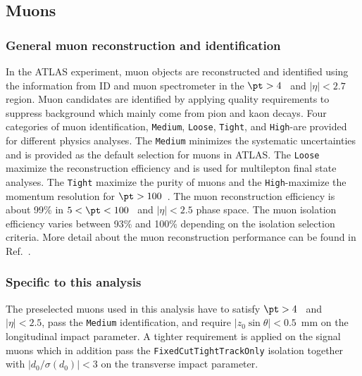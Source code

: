 
\subsection{Muons}
\label{subsec:event_muons}


\subsubsection{General muon reconstruction and identification}
\label{subsubsec:event_muons_general}
In the ATLAS experiment, muon objects are reconstructed and identified using the information from ID and muon spectrometer in the $\pt > 4$~{\GeV} and $|\eta| < 2.7$ region.
Muon candidates are identified by applying quality requirements to suppress background which mainly come from pion and kaon decays.
Four categories of muon identification, \texttt{Medium}, \texttt{Loose}, \texttt{Tight}, and \texttt{High}-\pt are provided for different physics analyses.
The \texttt{Medium} minimizes the systematic uncertainties and is provided as the default selection for muons in ATLAS.
The \texttt{Loose} maximize the reconstruction efficiency and is used for multilepton final state analyses.
The \texttt{Tight} maximize the purity of muons and the \texttt{High}-\pt maximize the momentum resolution for $\pt > 100$~{\GeV}.
The muon reconstruction efficiency is about 99\% in $5 < \pt < 100$~{\GeV} and $|\eta| < 2.5$ phase space.
The muon isolation efficiency varies between 93\% and 100\% depending on the isolation selection criteria.
More detail about the muon reconstruction performance can be found in Ref.~\cite{Aad:2016jkr}.


\subsubsection{Specific to this analysis}
\label{subsubsec:event_muons_specific}
The preselected muons used in this analysis have to satisfy $\pt > 4$~{\GeV} and $|\eta| < 2.5$, pass the \texttt{Medium} identification, and require $|z_{0}\sin\theta| < 0.5$~mm on the longitudinal impact parameter.
A tighter requirement is applied on the signal muons which in addition pass the \texttt{FixedCutTightTrackOnly} isolation together with $|d_{0}/\sigma(d_{0})| < 3$ on the transverse impact parameter.

